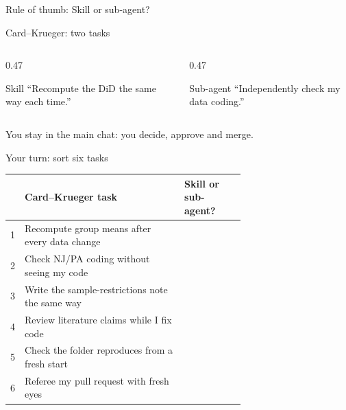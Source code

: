 \begin{frame}{Rule of thumb: Skill or sub-agent?}
\end{frame}

\begin{frame}{Card--Krueger: two tasks}
  \begin{columns}[T,onlytextwidth]
    \begin{column}{0.47\textwidth}
      \begin{block}{Skill}
        ``Recompute the DiD the same way each time.''
      \end{block}
    \end{column}
    \begin{column}{0.47\textwidth}
      \begin{block}{Sub-agent}
        ``Independently check my data coding.''
      \end{block}
    \end{column}
  \end{columns}
  \vspace{0.8em}
  You stay in the main chat: you decide, approve and merge.
\end{frame}

\begin{frame}{Your turn: sort six tasks}
  \vspace{0.2em}
  \small
  \begin{tabular}{@{}rp{0.68\linewidth}l@{}}
    \toprule
    & \textbf{Card--Krueger task} & \textbf{Skill or sub-agent?} \\
    \midrule
    1 & Recompute group means after every data change & \\
    2 & Check NJ/PA coding without seeing my code & \\
    3 & Write the sample-restrictions note the same way & \\
    4 & Review literature claims while I fix code & \\
    5 & Check the folder reproduces from a fresh start & \\
    6 & Referee my pull request with fresh eyes & \\
    \bottomrule
  \end{tabular}
\end{frame}
